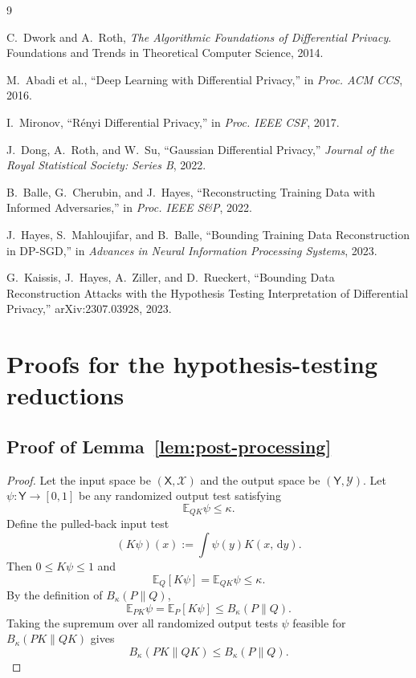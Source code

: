 \documentclass[conference,compsoc]{IEEEtran}
\newcommand{\E}{\mathbb{E}}
\newcommand{\dd}{\,\mathrm d}
\begin{document}

\begin{thebibliography}{9}

C.~Dwork and A.~Roth,
\newblock \emph{The Algorithmic Foundations of Differential Privacy}.
\newblock Foundations and Trends in Theoretical Computer Science, 2014.

M.~Abadi et al.,
``Deep Learning with Differential Privacy,''
in \emph{Proc. ACM CCS}, 2016.

I.~Mironov,
``R\'enyi Differential Privacy,''
in \emph{Proc. IEEE CSF}, 2017.

J.~Dong, A.~Roth, and W.~Su,
``Gaussian Differential Privacy,''
\emph{Journal of the Royal Statistical Society: Series B}, 2022.

B.~Balle, G.~Cherubin, and J.~Hayes,
``Reconstructing Training Data with Informed Adversaries,''
in \emph{Proc. IEEE S\&P}, 2022.

J.~Hayes, S.~Mahloujifar, and B.~Balle,
``Bounding Training Data Reconstruction in DP-SGD,''
in \emph{Advances in Neural Information Processing Systems}, 2023.

G.~Kaissis, J.~Hayes, A.~Ziller, and D.~Rueckert,
``Bounding Data Reconstruction Attacks with the Hypothesis Testing
Interpretation of Differential Privacy,''
arXiv:2307.03928, 2023.

\end{thebibliography}

\appendices

\section{Proofs for the hypothesis-testing reductions}
\label{app:hypothesis-testing-proofs}

\subsection{Proof of Lemma~\ref{lem:post-processing}}

\begin{proof}
Let the input space be $(\mathsf X,\mathcal X)$ and the output space be
$(\mathsf Y,\mathcal Y)$.  Let $\psi:\mathsf Y\to[0,1]$ be any randomized output
test satisfying
\[
\E_{QK}\psi\le \kappa.
\]
Define the pulled-back input test
\[
(K\psi)(x):=\int \psi(y)K(x,\dd y).
\]
Then $0\le K\psi\le1$ and
\[
\E_Q[K\psi]=\E_{QK}\psi\le\kappa.
\]
By the definition of $B_\kappa(P\|Q)$,
\[
\E_{PK}\psi=
\E_P[K\psi]
\le
B_\kappa(P\|Q).
\]
Taking the supremum over all randomized output tests $\psi$ feasible for
$B_\kappa(PK\|QK)$ gives
\[
B_\kappa(PK\|QK)\le B_\kappa(P\|Q).
\]
\end{proof}
\end{document}
